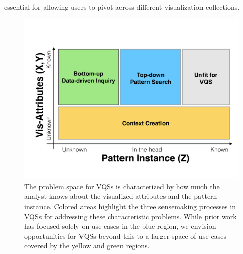 essential for allowing users to pivot across different visualization collections.
\begin{figure}[h!]
  \centering
  \includegraphics[width=0.9\linewidth]{figures/2dmodel.pdf}
  \caption{The problem space for VQSs is characterized by how much the analyst knows about the visualized attributes and the pattern instance. Colored areas highlight the three sensemaking processes in VQSs for addressing these characteristic problems. While prior work has focused solely on use cases in the blue region, we envision opportunities for VQSs beyond this to a larger space of use cases covered by the yellow and green regions.}
  \label{2dmodel}
  \vspace{-10pt}
\end{figure}

